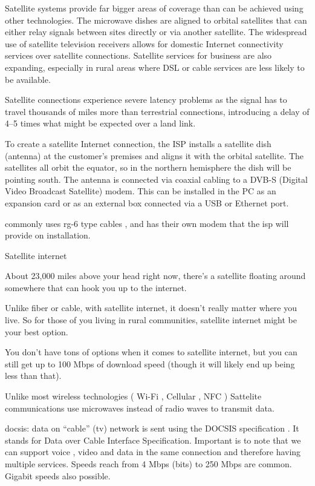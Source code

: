 Satellite systems provide far bigger areas of coverage than can be achieved using other technologies. The microwave dishes are aligned to orbital satellites that can either relay signals between sites directly or via another satellite. The widespread use of satellite television receivers allows for domestic Internet connectivity services over satellite connections. Satellite services for business are also expanding, especially in rural areas where DSL or cable services are less likely to be available.

Satellite connections experience severe latency problems as the signal has to travel thousands of miles more than terrestrial connections, introducing a delay of 4–5 times what might be expected over a land link.

To create a satellite Internet connection, the ISP installs a satellite dish (antenna) at the customer's premises and aligns it with the orbital satellite. The satellites all orbit the equator, so in the northern hemisphere the dish will be pointing south. The antenna is connected via coaxial cabling to a DVB-S (Digital Video Broadcast Satellite) modem. This can be installed in the PC as an expansion card or as an external box connected via a USB or Ethernet port.

commonly uses rg-6 type cables , and has their own modem that the isp will
provide on installation.


Satellite internet

About 23,000 miles above your head right now, there’s a satellite floating
around somewhere that can hook you up to the internet.

Unlike fiber or cable, with satellite internet, it doesn’t really matter where
you live. So for those of you living in rural communities, satellite internet
might be your best option.

You don’t have tons of options when it comes to satellite internet, but you can
still get up to 100 Mbps of download speed (though it will likely end up being
less than that).

Unlike most wireless technologies ( Wi-Fi , Cellular , NFC ) Sattelite communications use microwaves instead of radio waves to transmit data.
\subsubsectionend

docsis: data on ``cable'' (tv) network is sent using the DOCSIS specification .
It stands for Data over Cable Interface Specification.  Important is to note
that we can support voice , video and data in the same connection and therefore
having multiple services. Speeds reach from 4 Mbps (bits) to 250 Mbps are
common. Gigabit speeds also possible.



